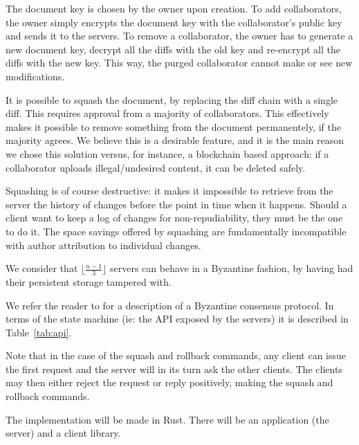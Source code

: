 The document key is chosen by the owner upon creation. To add collaborators, the owner
simply encrypts the document key with the collaborator's public
key and sends it to the servers. To remove a collaborator, the
owner has to generate a new document key, decrypt all the diffs
with the old key and re-encrypt all the diffs with the new key.
This way, the purged collaborator cannot make or see new
modifications.

It is possible to squash the document, by replacing the diff
chain with a single diff. This requires approval from a majority
of collaborators. This effectively makes it possible to remove
something from the document permanentely, if the majority agrees.
We believe this is a desirable feature, and it is the main reason
we chose this solution versus, for instance, a blockchain based
approach: if a collaborator uploads illegal/undesired content, it
can be deleted safely.

Squashing is of course destructive: it makes it impossible to retrieve
from the server the history of changes before the point in time when
it happens. Should a client want to keep a log of changes for non-repudiability,
they must be the one to do it. The space savings offered by squashing are
fundamentally incompatible with author attribution to individual changes.

We consider that $\lfloor \frac{n - 1}{3} \rfloor$ servers can
behave in a Byzantine fashion, by having had their persistent
storage tampered with.

We refer the reader to \cite{pbft} for a description of a Byzantine
consensus protocol. In terms of the state machine (ie: the API
exposed by the servers) it is described in Table~\ref{tab:api}.

Note that in the case of the squash and rollback commands, any
client can issue the first request and the server will in its
turn ask the other clients. The clients may then either reject
the request or reply positively, making the squash and rollback
commands.

The implementation will be made in Rust\cite{rust}. There will be an
application (the server) and a client library.
